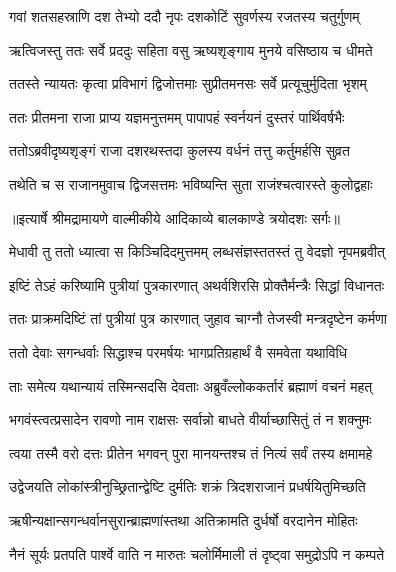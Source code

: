 \twolineshloka
{गवां शतसहस्राणि दश तेभ्यो ददौ नृपः}
{दशकोटिं सुवर्णस्य रजतस्य चतुर्गुणम्} %

\twolineshloka
{ऋत्विजस्तु ततः सर्वे प्रददुः सहिता वसु}
{ऋष्यशृङ्गाय मुनये वसिष्ठाय च धीमते} %

\twolineshloka
{ततस्ते न्यायतः कृत्वा प्रविभागं द्विजोत्तमाः}
{सुप्रीतमनसः सर्वे प्रत्यूचुर्मुदिता भृशम्} %

\twolineshloka
{ततः प्रीतमना राजा प्राप्य यज्ञमनुत्तमम्}
{पापापहं स्वर्नयनं दुस्तरं पार्थिवर्षभैः} %

\twolineshloka
{ततोऽब्रवीदृष्यशृङ्गं राजा दशरथस्तदा}
{कुलस्य वर्धनं तत्तु कर्तुमर्हसि सुव्रत} %

\twolineshloka
{तथेति च स राजानमुवाच द्विजसत्तमः}
{भविष्यन्ति सुता राजंश्चत्वारस्ते कुलोद्वहाः} %


{॥इत्यार्षे श्रीमद्रामायणे वाल्मीकीये आदिकाव्ये बालकाण्डे त्रयोदशः सर्गः॥}


\twolineshloka
{मेधावी तु ततो ध्यात्वा स किञ्चिदिदमुत्तमम्}
{लब्धसंज्ञस्ततस्तं तु वेदज्ञो नृपमब्रवीत्} %

\twolineshloka
{इष्टिं तेऽहं करिष्यामि पुत्रीयां पुत्रकारणात्}
{अथर्वशिरसि प्रोक्तैर्मन्त्रैः सिद्धां विधानतः} %

\twolineshloka
{ततः प्राक्रमदिष्टिं तां पुत्रीयां पुत्र कारणात्}
{जुहाव चाग्नौ तेजस्वी मन्त्रदृष्टेन कर्मणा} %

\twolineshloka
{ततो देवाः सगन्धर्वाः सिद्धाश्च परमर्षयः}
{भागप्रतिग्रहार्थं वै समवेता यथाविधि} %

\twolineshloka
{ताः समेत्य यथान्यायं तस्मिन्सदसि देवताः}
{अब्रुवँल्लोककर्तारं ब्रह्माणं वचनं महत्} %

\twolineshloka
{भगवंस्त्वत्प्रसादेन रावणो नाम राक्षसः}
{सर्वान्नो बाधते वीर्याच्छासितुं तं न शक्नुमः} %

\twolineshloka
{त्वया तस्मै वरो दत्तः प्रीतेन भगवन् पुरा}
{मानयन्तश्च तं नित्यं सर्वं तस्य क्षमामहे} %

\twolineshloka
{उद्वेजयति लोकांस्त्रीनुच्छ्रितान्द्वेष्टि दुर्मतिः}
{शक्रं त्रिदशराजानं प्रधर्षयितुमिच्छति} %

\twolineshloka
{ऋषीन्यक्षान्सगन्धर्वानसुरान्ब्राह्मणांस्तथा}
{अतिक्रामति दुर्धर्षो वरदानेन मोहितः} %

\twolineshloka
{नैनं सूर्यः प्रतपति पार्श्वे वाति न मारुतः}
{चलोर्मिमाली तं दृष्ट्वा समुद्रोऽपि न कम्पते} %

